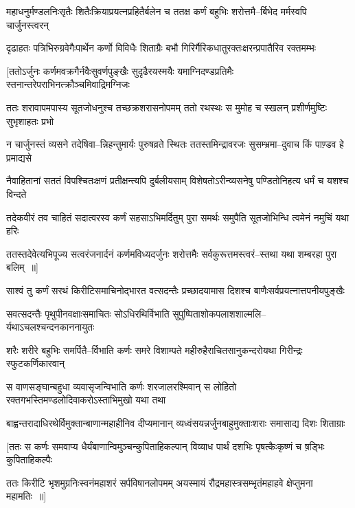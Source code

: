 \twolineshloka
{महाधनुर्मण्डलनिःसृतैः शितैःक्रियाप्रयत्नप्रहितैर्बलेन च}
{ततक्ष कर्णं बहुभिः शरोत्तमै--र्बिभेद मर्मस्वपि चार्जुनस्त्वरन्}


\twolineshloka
{दृढाहतः पत्रिभिरुग्रवेगैःपार्थेन कर्णो विविधैः शिताग्रैः}
{बभौ गिरिर्गैरिकधातुरक्तःक्षरन्प्रपातैरिव रक्तमम्भः}


\twolineshloka
{[ततोऽर्जुनः कर्णमवक्रगैर्नवैःसुवर्णपुङ्खैः सुदृढैरयस्मयैः}
{यमाग्निदण्डप्रतिमैः स्तनान्तरेपराभिनत्क्रौञ्चमिवाद्रिमग्निजः}


\threelineshloka
{ततः शरावापमपास्य सूतजोधनुश्च तच्छक्रशरासनोपमम्}
{ततो रथस्थः स मुमोह च स्खलन्}
{प्रशीर्णमुष्टिः सुभृशाहतः प्रभो}


\twolineshloka
{न चार्जुनस्तं व्यसने तदेषिवा--न्निहन्तुमार्यः पुरुषव्रते स्थितः}
{ततस्तमिन्द्रावरजः सुसम्भ्रमा--दुवाच किं पाण़्डव हे प्रमाद्यसे}


\twolineshloka
{नैवाहितानां सततं विपश्चितःक्षणं प्रतीक्षन्त्यपि दुर्बलीयसाम्}
{विशेषतोऽरीन्व्यसनेषु पण्डितोनिहत्य धर्मं च यशश्च विन्दते}


\twolineshloka
{तदेकवीरं तव चाहितं सदात्वरस्व कर्णं सहसाऽभिमर्दितुम्}
{पुरा समर्थः समुपैति सूतजोभिन्धि त्वमेनं नमुचिं यथा हरिः}


\twolineshloka
{ततस्तदेवेत्यभिपूज्य सत्वरंजनार्दनं कर्णमविध्यदर्जुनः}
{शरोत्तमैः सर्वकुरूत्तमस्त्वरं--स्तथा यथा शम्बरहा पुरा बलिम् ॥]}


\twolineshloka
{साश्वं तु कर्णं सरथं किरीटिसमाचिनोद्भारत वत्सदन्तैः}
{प्रच्छादयामास दिशश्च बाणैःसर्वप्रयत्नात्तपनीयपुङ्खैः}


\twolineshloka
{सवत्सदन्तैः पृथुपीनवक्षाःसमाचितः सोऽधिरथिर्विभाति}
{सुपुष्पिताशोकपलाशशाल्मलि--र्यथाऽचलश्चन्दनकाननायुतः}


\twolineshloka
{शरैः शरीरे बहुभिः समर्पितै--र्विभाति कर्णः समरे विशाम्पते}
{महीरुहैराचितसानुकन्दरोयथा गिरीन्द्रः स्फुटकर्णिकारवान्}


\twolineshloka
{स वाणसङ्घान्बहुधा व्यवासृजन्विभाति कर्णः शरजालरश्मिवान्}
{स लोहितो रक्तगभस्तिमण्डलोदिवाकरोऽस्ताभिमुखो यथा तथा}


\twolineshloka
{बाह्वन्तरादाधिरथेर्विमुक्तान्बाणान्महाहीनिव दीप्यमानान्}
{व्यध्वंसयन्नर्जुनबाहुमुक्ताःशराः समासाद्य दिशः शिताग्राः}


\twolineshloka
{[ततः स कर्णः समवाप्य धैर्यंबाणान्विमुञ्चन्कुपिताहिकल्पान्}
{विव्याध पार्थं दशभिः पृषत्कैःकृष्णं च ष़ड्भिः कुपिताहिकल्पैः}


\twolineshloka
{ततः किरीटि भृशमुग्रनिःस्वनंमहाशरं सर्पविषानलोपमम्}
{अयस्मायं रौद्रमहास्त्रसम्भृतंमहाहवे क्षेप्तुमना महामतिः ॥]}



